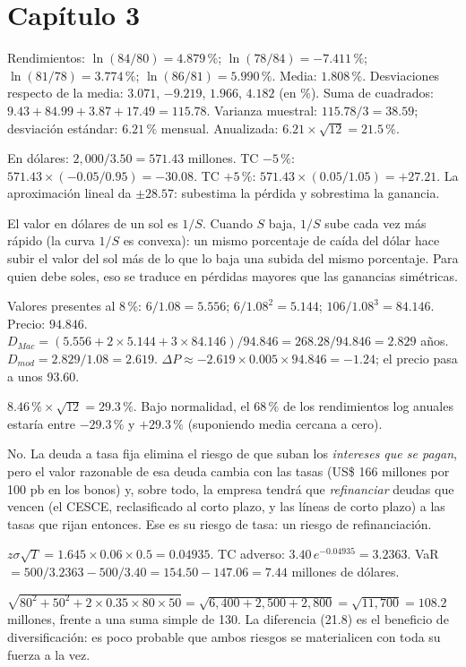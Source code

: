 \section*{Capítulo 3}

 Rendimientos: $\ln(84/80)=4.879\,\%$; $\ln(78/84)=-7.411\,\%$; $\ln(81/78)=3.774\,\%$; $\ln(86/81)=5.990\,\%$. Media: $1.808\,\%$. Desviaciones respecto de la media: $3.071$, $-9.219$, $1.966$, $4.182$ (en \%). Suma de cuadrados: $9.43+84.99+3.87+17.49=115.78$. Varianza muestral: $115.78/3=38.59$; desviación estándar: $6.21\,\%$ mensual. Anualizada: $6.21\times\sqrt{12}=21.5\,\%$.

 En dólares: $2{,}000/3.50=571.43$ millones. TC $-5\,\%$: $571.43\times(-0.05/0.95)=-30.08$. TC $+5\,\%$: $571.43\times(0.05/1.05)=+27.21$. La aproximación lineal da $\pm28.57$: subestima la pérdida y sobrestima la ganancia.

 El valor en dólares de un sol es $1/S$. Cuando $S$ baja, $1/S$ sube cada vez más rápido (la curva $1/S$ es convexa): un mismo porcentaje de caída del dólar hace subir el valor del sol más de lo que lo baja una subida del mismo porcentaje. Para quien debe soles, eso se traduce en pérdidas mayores que las ganancias simétricas.

 Valores presentes al 8\,\%: $6/1.08=5.556$; $6/1.08^2=5.144$; $106/1.08^3=84.146$. Precio: $94.846$. $D_{Mac}=(5.556+2\times5.144+3\times84.146)/94.846=268.28/94.846=2.829$ años. $D_{mod}=2.829/1.08=2.619$. $\Delta P\approx-2.619\times0.005\times94.846=-1.24$; el precio pasa a unos 93.60.

 $8.46\,\%\times\sqrt{12}=29.3\,\%$. Bajo normalidad, el 68\,\% de los rendimientos log anuales estaría entre $-29.3\,\%$ y $+29.3\,\%$ (suponiendo media cercana a cero).

 No. La deuda a tasa fija elimina el riesgo de que suban los \emph{intereses que se pagan}, pero el valor razonable de esa deuda cambia con las tasas (US\$ 166 millones por 100 pb en los bonos) y, sobre todo, la empresa tendrá que \emph{refinanciar} deudas que vencen (el CESCE, reclasificado al corto plazo, y las líneas de corto plazo) a las tasas que rijan entonces. Ese es su riesgo de tasa: un riesgo de refinanciación.

 $z\sigma\sqrt T=1.645\times0.06\times0.5=0.04935$. TC adverso: $3.40\,e^{-0.04935}=3.2363$. VaR $=500/3.2363-500/3.40=154.50-147.06=7.44$ millones de dólares.

 $\sqrt{80^2+50^2+2\times0.35\times80\times50}=\sqrt{6{,}400+2{,}500+2{,}800}=\sqrt{11{,}700}=108.2$ millones, frente a una suma simple de 130. La diferencia (21.8) es el beneficio de diversificación: es poco probable que ambos riesgos se materialicen con toda su fuerza a la vez.
